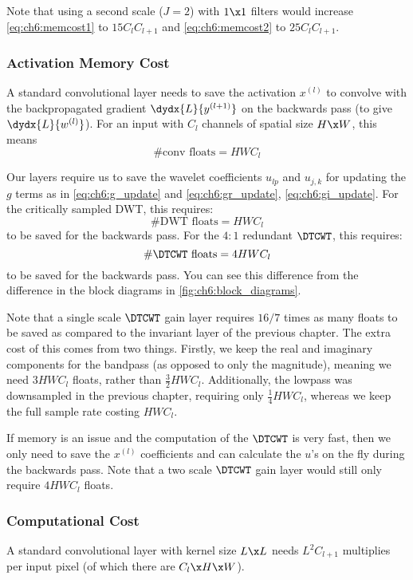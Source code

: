 Note that using a second scale ($J=2$) with $1\x 1$ filters would increase
\eqref{eq:ch6:memcost1} to $15C_lC_{l+1}$ and \eqref{eq:ch6:memcost2} to
$25C_lC_{l+1}$.  

\subsubsection{Activation Memory Cost}\label{sec:ch6:act_memory}
A standard convolutional layer needs to save the activation $x^{(l)}$ to
convolve with the backpropagated gradient $\dydx{L}{y^{(l+1)}}$ on the backwards
pass (to give $\dydx{L}{w^{(l)}}$). For an input with $C_l$ channels of spatial
size $H\x W$, this means
%
\begin{equation}
  \text{\#conv floats} = HWC_l 
\end{equation}

Our layers require us to save the wavelet coefficients $u_{lp}$ and  $u_{j,k}$
for updating the $g$ terms as in \eqref{eq:ch6:g_update} and
\eqref{eq:ch6:gr_update}, \eqref{eq:ch6:gi_update}.  For the critically sampled
DWT, this requires:
%
\begin{equation}
  \text{\#DWT floats} = HWC_l 
\end{equation}
%
to be saved for the backwards pass. For the $4:1$ redundant $\DTCWT$, this 
requires:
%
\begin{equation}
  \text{\#$\DTCWT$ floats} = 4HWC_l 
\end{equation}
%
to be saved for the backwards pass.  You can see this difference from the
difference in the block diagrams in \autoref{fig:ch6:block_diagrams}.

Note that a single scale $\DTCWT$ gain layer requires $16/7$ times as many
floats to be saved as compared to the invariant layer of the previous chapter.
The extra cost of this comes from two things. Firstly, we keep the real and
imaginary components for the bandpass (as opposed to only the magnitude),
meaning we need $3HWC_l$ floats, rather than $\frac{3}{2}HWC_l$. Additionally,
the lowpass was downsampled in the previous chapter, requiring only
$\frac{1}{4}HWC_l$, whereas we keep the full sample rate costing $HWC_l$.

If memory is an issue and the computation of the $\DTCWT$ is very fast, then we
only need to save the $x^(l)$ coefficients and can calculate the $u$'s on the
fly during the backwards pass. Note that a two scale $\DTCWT$ gain layer would
still only require $4HWC_l$ floats.

\subsubsection{Computational Cost}\label{sec:ch6:computation}
A standard convolutional layer with kernel size $L\x L$ needs $L^2C_{l+1}$
multiplies per input pixel (of which there are $C_{l}\x H\x W$).

